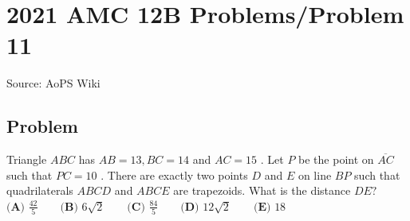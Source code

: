 \documentclass[12pt]{article}
\begin{document}
\section*{{2021 AMC 12B Problems/Problem 11}}
Source: AoPS Wiki

\subsection*{Problem}
Triangle $ABC$ has $AB=13,BC=14$ and $AC=15$ . Let $P$ be the point on $\overline{AC}$ such that $PC=10$ . There are exactly two points $D$ and $E$ on line $BP$ such that quadrilaterals $ABCD$ and $ABCE$ are trapezoids. What is the distance $DE?$ $\textbf{(A) }\frac{42}5 \qquad \textbf{(B) }6\sqrt2 \qquad \textbf{(C) }\frac{84}5\qquad \textbf{(D) }12\sqrt2 \qquad \textbf{(E) }18$
\end{document}

